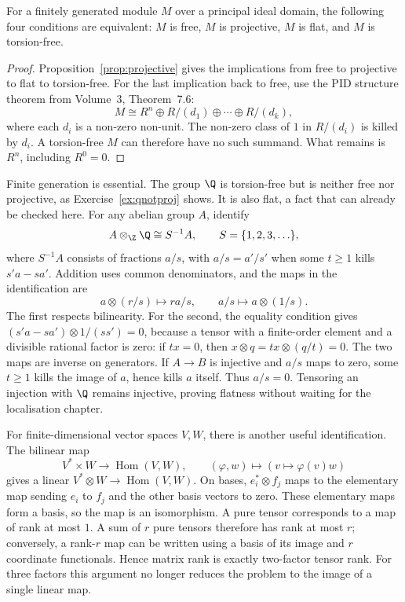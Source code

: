 \begin{theorem}\label{thm:pidflat}
For a finitely generated module $M$ over a principal ideal domain, the following four conditions are equivalent: $M$ is free, $M$ is projective, $M$ is flat, and $M$ is torsion-free.
\end{theorem}

\begin{proof}
Proposition~\ref{prop:projective} gives the implications from free to projective to flat to torsion-free. For the last implication back to free, use the PID structure theorem from Volume~3, Theorem~7.6:
\[
M\cong R^n\oplus R/(d_1)\oplus\cdots\oplus R/(d_k),
\]
where each $d_i$ is a non-zero non-unit. The non-zero class of $1$ in $R/(d_i)$ is killed by $d_i$. A torsion-free $M$ can therefore have no such summand. What remains is $R^n$, including $R^0=0$.
\end{proof}

Finite generation is essential. The group $\Q$ is torsion-free but is neither free nor projective, as Exercise~\ref{ex:qnotproj} shows. It is also flat, a fact that can already be checked here. For any abelian group $A$, identify
\[
A\otimes_\Z\Q\cong S^{-1}A,\qquad S=\{1,2,3,\ldots\},
\]
where $S^{-1}A$ consists of fractions $a/s$, with $a/s=a'/s'$ when some $t\ge1$ kills $s'a-sa'$. Addition uses common denominators, and the maps in the identification are
\[
a\otimes(r/s)\longmapsto ra/s,\qquad
 a/s\longmapsto a\otimes(1/s).
\]
The first respects bilinearity. For the second, the equality condition gives
$(s'a-sa')\otimes1/(ss')=0$, because a tensor with a finite-order element and a divisible rational factor is zero: if $tx=0$, then $x\otimes q=tx\otimes(q/t)=0$. The two maps are inverse on generators. If $A\to B$ is injective and $a/s$ maps to zero, some $t\ge1$ kills the image of $a$, hence kills $a$ itself. Thus $a/s=0$. Tensoring an injection with $\Q$ remains injective, proving flatness without waiting for the localisation chapter.

For finite-dimensional vector spaces $V,W$, there is another useful identification. The bilinear map
\[
V^*\times W\to\operatorname{Hom}(V,W),\qquad
(\varphi,w)\mapsto(v\mapsto\varphi(v)w)
\]
gives a linear $V^*\otimes W\to\operatorname{Hom}(V,W)$. On bases, $e_i^*\otimes f_j$ maps to the elementary map sending $e_i$ to $f_j$ and the other basis vectors to zero. These elementary maps form a basis, so the map is an isomorphism. A pure tensor corresponds to a map of rank at most $1$. A sum of $r$ pure tensors therefore has rank at most $r$; conversely, a rank-$r$ map can be written using a basis of its image and $r$ coordinate functionals. Hence matrix rank is exactly two-factor tensor rank. For three factors this argument no longer reduces the problem to the image of a single linear map.

